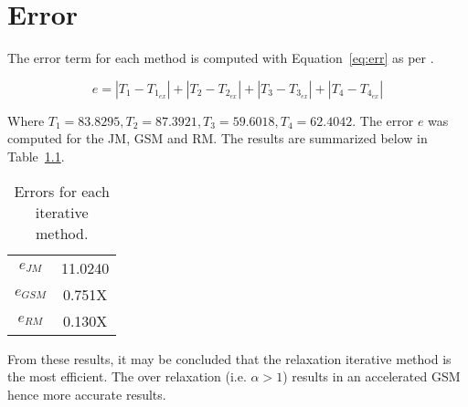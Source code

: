 \chapter{Error}
\label{chap:error}

The error term for each method is computed with Equation~\ref{eq:err} as per \cite{assign}.

\begin{equation}
	\label{eq:err}	
	e = |T_1 - T_{1_{ex}}|+|T_2 - T_{2_{ex}}|+|T_3 - T_{3_{ex}}|+|T_4 - T_{4_{ex}}|
\end{equation}

Where $T_1 = 83.8295, T_2 = 87.3921, T_3 = 59.6018, T_4 = 62.4042$. The error $e$ was computed for the JM, GSM and RM. The results are summarized below in Table~\ref{tab:err}.

\begin{table}[H]
  \centering
  \caption{Errors for each iterative method.}
    \begin{tabular}{c|c}
    \hline
    $e_{JM}$ 	& 11.0240 \\
    $e_{GSM}$ 	& 0.751X \\
    $e_{RM}$ 	& 0.130X \\
    \hline
    \end{tabular}
  \label{tab:err}
\end{table}

From these results, it may be concluded that the relaxation iterative method is the most efficient. The over relaxation  (i.e. $\alpha>1$) results in an accelerated GSM hence more accurate results. \\




